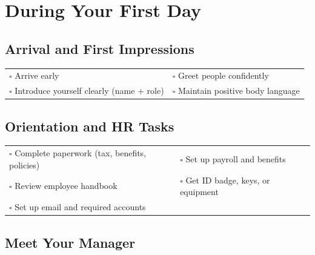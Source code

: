 
\section{During Your First Day}
\label{sec:during}

\subsection{Arrival and First Impressions}

\begin{tabular}{p{9cm} p{8cm}}
$\square$ Arrive early & $\square$ Greet people confidently \\ 
$\square$ Introduce yourself clearly (name + role) & $\square$ Maintain positive body language \\ 
\end{tabular}

\subsection{Orientation and HR Tasks}

\begin{tabular}{p{9cm} p{8cm}}
$\square$ Complete paperwork (tax, benefits, policies) & $\square$ Set up payroll and benefits \\ 
$\square$ Review employee handbook & $\square$ Get ID badge, keys, or equipment \\ 
$\square$ Set up email and required accounts & \\ 
\end{tabular}

\subsection{Meet Your Manager}

